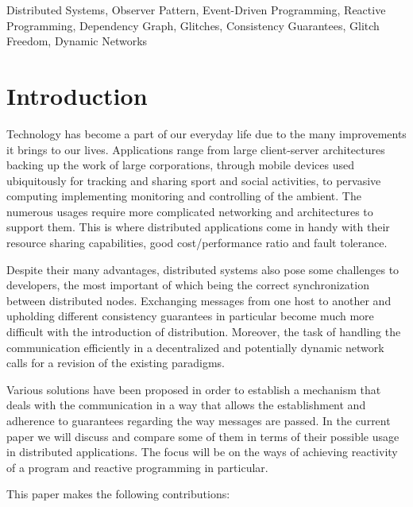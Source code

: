 \documentclass{sigplanconf}
\begin{document}


\keywords
Distributed Systems, Observer Pattern, Event-Driven Programming, Reactive Programming, Dependency Graph, Glitches, Consistency Guarantees, Glitch Freedom, Dynamic Networks

\section{Introduction}

Technology has become a part of our everyday life due to the many improvements it brings to our lives. Applications range from large client-server architectures backing up the work of large corporations, through mobile devices used ubiquitously for tracking and sharing sport and social activities, to pervasive computing implementing monitoring and controlling of the ambient. The numerous usages require more complicated networking and architectures to support them. This is where distributed applications come in handy with their resource sharing capabilities, good cost/performance ratio and fault tolerance.

Despite their many advantages, distributed systems also pose some challenges to developers, the most important of which being the correct synchronization between distributed nodes. Exchanging messages from one host to another and upholding different consistency guarantees in particular become much more difficult with the introduction of distribution. Moreover, the task of handling the communication efficiently in a decentralized and potentially dynamic network calls for a revision of the existing paradigms. 

Various solutions have been proposed in order to establish a mechanism that deals with the communication in a way that allows the establishment and adherence to guarantees regarding the way messages are passed. In the current paper we will discuss and compare some of them in terms of their possible usage in distributed applications. The focus will be on the ways of achieving reactivity of a program and reactive programming in particular.

This paper makes the following contributions:
\end{document}
